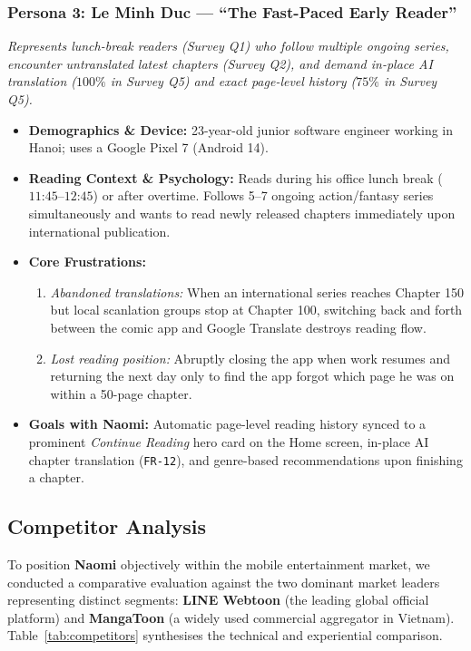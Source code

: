 \subsubsection{Persona 3: Le Minh Duc --- ``The Fast-Paced Early Reader''}
\textit{Represents lunch-break readers (Survey Q1) who follow multiple ongoing series, encounter untranslated latest chapters (Survey Q2), and demand in-place AI translation ($100\%$ in Survey Q5) and exact page-level history ($75\%$ in Survey Q5).}
\begin{itemize}
    \item \textbf{Demographics \& Device:} 23-year-old junior software engineer working in Hanoi; uses a Google Pixel 7 (Android 14).
    \item \textbf{Reading Context \& Psychology:} Reads during his office lunch break ($11\text{:}45\text{--}12\text{:}45$) or after overtime. Follows 5--7 ongoing action/fantasy series simultaneously and wants to read newly released chapters immediately upon international publication.
    \item \textbf{Core Frustrations:}
    \begin{enumerate}[label=(\alph*)]
        \item \textit{Abandoned translations:} When an international series reaches Chapter 150 but local scanlation groups stop at Chapter 100, switching back and forth between the comic app and Google Translate destroys reading flow.
        \item \textit{Lost reading position:} Abruptly closing the app when work resumes and returning the next day only to find the app forgot which page he was on within a 50-page chapter.
    \end{enumerate}
    \item \textbf{Goals with Naomi:} Automatic page-level reading history synced to a prominent \textit{Continue Reading} hero card on the Home screen, in-place AI chapter translation (\texttt{FR-12}), and genre-based recommendations upon finishing a chapter.
\end{itemize}

\subsection{Competitor Analysis}
\label{subsec:competitor_analysis}

To position \textbf{Naomi} objectively within the mobile entertainment market, we conducted a comparative evaluation against the two dominant market leaders representing distinct segments: \textbf{LINE Webtoon} (the leading global official platform) and \textbf{MangaToon} (a widely used commercial aggregator in Vietnam). Table~\ref{tab:competitors} synthesises the technical and experiential comparison.

